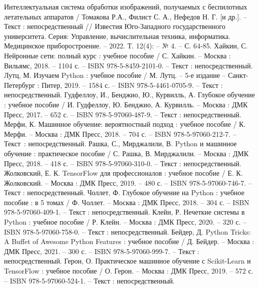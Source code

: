 
\begin{thebibliography}{50}

     Интеллектуальная система обработки изображений, получаемых с беспилотных летательных аппаратов / Томакова Р.А., Филист С. А., Нефедов Н. Г. [и др.]. – Текст : непосредственный // Известия Юго-Западного государственного университета. Серия: Управление, вычислительная техника, информатика. Медицинское приборостроение. – 2022. Т. 12(4): – № 4. – С. 64-85.
     Хайкин, С. Нейронные сети: полный курс : учебное пособие / С. Хайкин. – Москва : Вильямс, 2018. – 1104 с. – ISBN 978-5-8459-2101-0. – Текст : непосредственный.
     Лутц, М. Изучаем Python : учебное пособие  / М. Лутц. –  5-е издание – Санкт-Петербург : Питер, 2019. – 1584 с. – ISBN 978-5-4461-0705-9. – Текст : непосредственный.
     Гудфеллоу, И., Бенджио, Ю., Курвилль, А. Глубокое обучение : учебное пособие / И. Гудфеллоу, Ю. Бенджио, А. Курвилль. – Москва : ДМК Пресс, 2017. – 652 с. – ISBN 978-5-97060-487-9. – Текст : непосредственный.
     Мерфи, К. Машинное обучение: вероятностный подход : учебное пособие / К. Мерфи. – Москва : ДМК Пресс, 2018. – 704 с. – ISBN 978-5-97060-212-7. – Текст~: непосредственный.
     Рашка, С., Мирджалили, В. Python и машинное обучение : практическое пособие / С. Рашка, В. Мирджалили. – Москва : ДМК Пресс, 2018. – 418 с. – ISBN 978-5-97060-310-0. – Текст : непосредственный.
     Жолковский, Е. К. TensorFlow для профессионалов : учебное пособие / Е. К. Жолковский. – Москва : ДМК Пресс, 2019. – 480 с. – ISBN 978-5-97060-746-7. – Текст : непосредственный.
     Чоллет, Ф. Глубокое обучение на Python : учебное пособие : в 5 томах / Ф. Чоллет. – Москва : ДМК Пресс, 2018. – 304 с. – ISBN 978-5-97060-409-1. – Текст : непосредственный.
     Клейн, Р. Нечеткие системы в Python : учебное пособие / Р. Клейн. – Москва : ДМК Пресс, 2020. – 320 с. – ISBN 978-5-97060-758-0. – Текст : непосредственный.
     Бейдер, Д. Python Tricks: A Buffet of Awesome Python Features : учебное пособие / Д. Бейдер. – Москва : ДМК Пресс, 2021. – 300 с. – ISBN 978-5-97060-999-7. – Текст : непосредственный.
     Герон, О. Практическое машинное обучение с Scikit-Learn и TensorFlow : учебное пособие / О. Герон. – Москва : ДМК Пресс, 2019. – 572 с. – ISBN 978-5-97060-524-1. – Текст : непосредственный.

\end{thebibliography}
